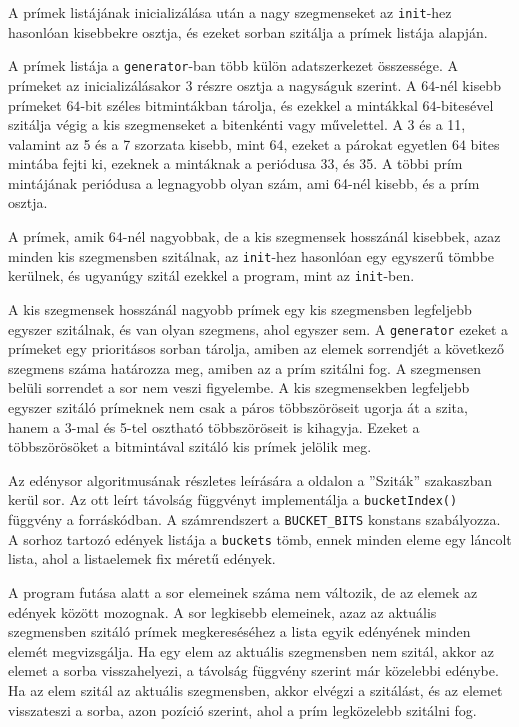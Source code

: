 A prímek listájának inicializálása után a nagy szegmenseket az \texttt{init}-hez hasonlóan kisebbekre osztja, és ezeket sorban szitálja a prímek listája alapján.

A prímek listája a \texttt{generator}-ban több külön adatszerkezet összessége.
A prímeket az inicializálásakor 3 részre osztja a nagyságuk szerint.
A $64$-nél kisebb prímeket $64$-bit széles bitmintákban tárolja, és ezekkel a mintákkal $64$-bitesével szitálja végig a kis szegmenseket a bitenkénti vagy művelettel.
A 3 és a 11, valamint az 5 és a 7 szorzata kisebb, mint 64, ezeket a párokat egyetlen $64$ bites mintába fejti ki, ezeknek a mintáknak a periódusa 33, és 35.
A többi prím mintájának periódusa a legnagyobb olyan szám, ami 64-nél kisebb, és a prím osztja.

A prímek, amik $64$-nél nagyobbak, de a kis szegmensek hosszánál kisebbek, azaz minden kis szegmensben szitálnak, az \texttt{init}-hez hasonlóan egy egyszerű tömbbe kerülnek, és ugyanúgy szitál ezekkel a program, mint az \texttt{init}-ben.

A kis szegmensek hosszánál nagyobb prímek egy kis szegmensben legfeljebb egyszer szitálnak, és van olyan szegmens, ahol egyszer sem.
A \texttt{generator} ezeket a prímeket egy prioritásos sorban tárolja, amiben az elemek sorrendjét a következő szegmens száma határozza meg, amiben az a prím szitálni fog.
A szegmensen belüli sorrendet a sor nem veszi figyelembe.
A kis szegmensekben legfeljebb egyszer szitáló prímeknek nem csak a páros többszöröseit ugorja át a szita, hanem a 3-mal és 5-tel osztható többszöröseit is kihagyja.
Ezeket a többszörösöket a bitmintával szitáló kis prímek jelölik meg.

Az edénysor algoritmusának részletes leírására a \pageref{sec:szitak} oldalon a ''Sziták'' szakaszban kerül sor.
Az ott leírt távolság függvényt implementálja a \texttt{bucketIndex()} függvény a forráskódban.
A számrendszert a \texttt{BUCKET\_BITS} konstans szabályozza.
A sorhoz tartozó edények listája a \texttt{buckets} tömb, ennek minden eleme egy láncolt lista, ahol a listaelemek fix méretű edények.

A program futása alatt a sor elemeinek száma nem változik, de az elemek az edények között mozognak.
A sor legkisebb elemeinek, azaz az aktuális szegmensben szitáló prímek megkereséséhez a lista egyik edényének minden elemét megvizsgálja.
Ha egy elem az aktuális szegmensben nem szitál, akkor az elemet a sorba visszahelyezi, a távolság függvény szerint már közelebbi edénybe.
Ha az elem szitál az aktuális szegmensben, akkor elvégzi a szitálást, és az elemet visszateszi a sorba, azon pozíció szerint, ahol a prím legközelebb szitálni fog.

